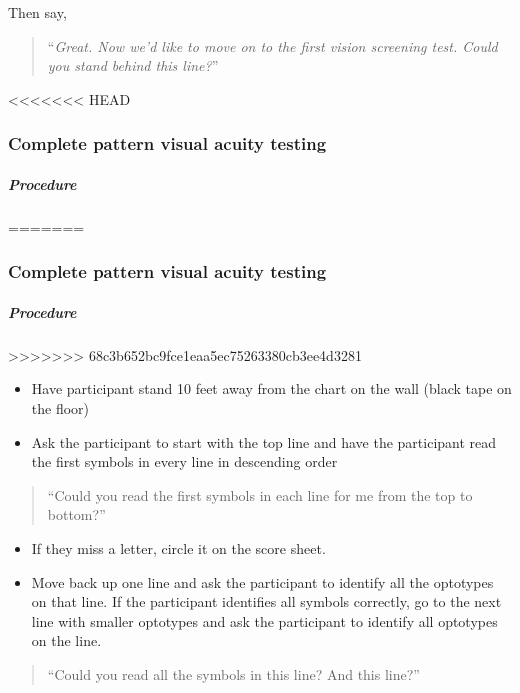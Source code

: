 \documentclass[]{article}
\providecommand{\tightlist}{%
  \setlength{\itemsep}{0pt}\setlength{\parskip}{0pt}}
\let\oldsubparagraph\subparagraph
\renewcommand{\subparagraph}[1]{\oldsubparagraph{#1}\mbox{}}
\begin{document}
Then say,

\begin{quote}
``\emph{Great. Now we'd like to move on to the first vision screening
test. Could you stand behind this line?}''
\end{quote}

<<<<<<< HEAD
\subsubsection{Complete pattern visual acuity
testing}\label{complete-pattern-visual-acuity-testing}

\subparagraph{Procedure}\label{procedure}
=======
\hypertarget{complete-pattern-visual-acuity-testing}{%
\subsubsection{Complete pattern visual acuity
testing}\label{complete-pattern-visual-acuity-testing}}

\hypertarget{procedure}{%
\subparagraph{Procedure}\label{procedure}}
>>>>>>> 68c3b652bc9fce1eaa5ec75263380cb3ee4d3281

\begin{itemize}
\tightlist
\item
  Have participant stand 10 feet away from the chart on the wall (black
  tape on the floor)
\item
  Ask the participant to start with the top line and have the
  participant read the first symbols in every line in descending order
\end{itemize}

\begin{quote}
``Could you read the first symbols in each line for me from the top to
bottom?''
\end{quote}

\begin{itemize}
\tightlist
\item
  If they miss a letter, circle it on the score sheet.
\item
  Move back up one line and ask the participant to identify all the
  optotypes on that line. If the participant identifies all symbols
  correctly, go to the next line with smaller optotypes and ask the
  participant to identify all optotypes on the line.
\end{itemize}

\begin{quote}
``Could you read all the symbols in this line? And this line?''
\end{quote}
\end{document}
